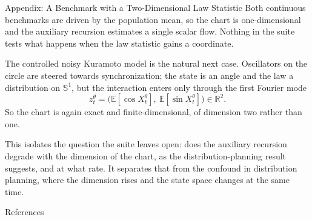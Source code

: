 \documentclass[9pt]{beamer}
\def\E{{\mathbb E}}
\def\R{{\mathbb R}}
\begin{document}
\begin{frame}{Appendix: A Benchmark with a Two-Dimensional Law Statistic}
\small
Both continuous benchmarks are driven by the population mean, so the chart is one-dimensional and the auxiliary recursion estimates a single scalar flow. Nothing in the suite tests what happens when the law statistic gains a coordinate.

\vspace{0.2cm}
The controlled noisy Kuramoto model is the natural next case. Oscillators on the circle are steered towards synchronization; the state is an angle and the law a distribution on $\mathbb S^1$, but the interaction enters only through the first Fourier mode
\[
  z_t^\theta=\big(\E[\cos X_t^\theta],\ \E[\sin X_t^\theta]\big)\in\R^2 .
\]
So the chart is again exact and finite-dimensional, of dimension two rather than one.

\vspace{0.15cm}
This isolates the question the suite leaves open: does the auxiliary recursion degrade with the dimension of the chart, as the distribution-planning result suggests, and at what rate. It separates that from the confound in distribution planning, where the dimension rises and the state space changes at the same time.
\end{frame}

\begin{frame}[allowframebreaks]{References}
\scriptsize
\printbibliography
\end{frame}
\end{document}

